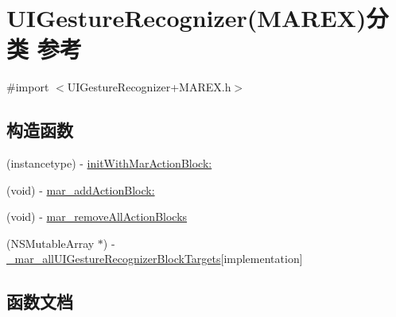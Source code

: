 \hypertarget{category_u_i_gesture_recognizer_07_m_a_r_e_x_08}{}\section{U\+I\+Gesture\+Recognizer(M\+A\+R\+EX)分类 参考}
\label{category_u_i_gesture_recognizer_07_m_a_r_e_x_08}


{\ttfamily \#import $<$U\+I\+Gesture\+Recognizer+\+M\+A\+R\+E\+X.\+h$>$}

\subsection*{构造函数}
\begin{DoxyCompactItemize}
\item 
(instancetype) -\/ \hyperlink{category_u_i_gesture_recognizer_07_m_a_r_e_x_08_adbbf5deead95cf3afe6c88c693efbe33}{init\+With\+Mar\+Action\+Block\+:}
\item 
(void) -\/ \hyperlink{category_u_i_gesture_recognizer_07_m_a_r_e_x_08_a950044b3d39a1c6e771e124c6d435aac}{mar\+\_\+add\+Action\+Block\+:}
\item 
(void) -\/ \hyperlink{category_u_i_gesture_recognizer_07_m_a_r_e_x_08_a3c4dd9de6912147a75e39e0afd2ecc0f}{mar\+\_\+remove\+All\+Action\+Blocks}
\item 
(N\+S\+Mutable\+Array $\ast$) -\/ \hyperlink{category_u_i_gesture_recognizer_07_m_a_r_e_x_08_a845f609c13f91009e596d0b5587287e6}{\+\_\+mar\+\_\+all\+U\+I\+Gesture\+Recognizer\+Block\+Targets}{\ttfamily  \mbox{[}implementation\mbox{]}}
\end{DoxyCompactItemize}


\subsection{函数文档}
\mbox{\label{category_u_i_gesture_recognizer_07_m_a_r_e_x_08_a845f609c13f91009e596d0b5587287e6}} 
